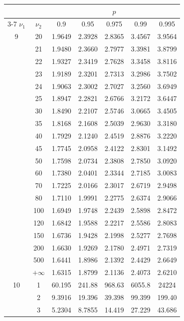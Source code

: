 \hfill
\begin{minipage}{0.49\textwidth}
	\begin{center}
		\begin{tabular}{ccccccc}
			& & \multicolumn{5}{c}{$p$}\\
			\cline{3-7}
			$\nu_1$ & $\nu_2$ & 0.9 & 0.95 & 0.975 & 0.99 & 0.995 \\
			\midrule
			9 & 20 & 1.9649 & 2.3928 & 2.8365 & 3.4567 & 3.9564 \\
			& 21 & 1.9480 & 2.3660 & 2.7977 & 3.3981 & 3.8799 \\
			& 22 & 1.9327 & 2.3419 & 2.7628 & 3.3458 & 3.8116 \\
			& 23 & 1.9189 & 2.3201 & 2.7313 & 3.2986 & 3.7502 \\
			& 24 & 1.9063 & 2.3002 & 2.7027 & 3.2560 & 3.6949 \\
			& 25 & 1.8947 & 2.2821 & 2.6766 & 3.2172 & 3.6447 \\
			& 30 & 1.8490 & 2.2107 & 2.5746 & 3.0665 & 3.4505 \\
			& 35 & 1.8168 & 2.1608 & 2.5039 & 2.9630 & 3.3180 \\
			& 40 & 1.7929 & 2.1240 & 2.4519 & 2.8876 & 3.2220 \\
			& 45 & 1.7745 & 2.0958 & 2.4122 & 2.8301 & 3.1492 \\[5pt]
			& 50 & 1.7598 & 2.0734 & 2.3808 & 2.7850 & 3.0920 \\
			& 60 & 1.7380 & 2.0401 & 2.3344 & 2.7185 & 3.0083 \\
			& 70 & 1.7225 & 2.0166 & 2.3017 & 2.6719 & 2.9498 \\
			& 80 & 1.7110 & 1.9991 & 2.2775 & 2.6374 & 2.9066 \\
			& 100 & 1.6949 & 1.9748 & 2.2439 & 2.5898 & 2.8472 \\
			& 120 & 1.6842 & 1.9588 & 2.2217 & 2.5586 & 2.8083 \\
			& 150 & 1.6736 & 1.9428 & 2.1998 & 2.5277 & 2.7698 \\
			& 200 & 1.6630 & 1.9269 & 2.1780 & 2.4971 & 2.7319 \\
			& 500 & 1.6441 & 1.8986 & 2.1392 & 2.4429 & 2.6649 \\
			& $+\infty$ & 1.6315 & 1.8799 & 2.1136 & 2.4073 & 2.6210 \\
			\midrule
			10 & 1 & 60.195 & 241.88 & 968.63 & 6055.8 & 24224 \\
			& 2 & 9.3916 & 19.396 & 39.398 & 99.399 & 199.40 \\
			& 3 & 5.2304 & 8.7855 & 14.419 & 27.229 & 43.686 \\

\end{tabular}
\end{center}
\end{minipage}
